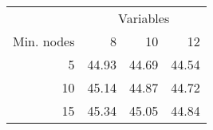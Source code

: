 \begin{tabular}{rrrr}
\hline
\multicolumn{1}{c}{ } & \multicolumn{3}{c}{Variables} \\
Min. nodes & 8 & 10 & 12\\
\hline
5 & 44.93 & 44.69 & 44.54\\
10 & 45.14 & 44.87 & 44.72\\
15 & 45.34 & 45.05 & 44.84\\
\hline
\end{tabular}
